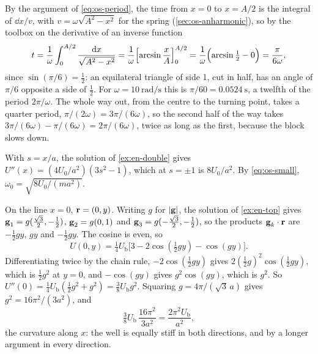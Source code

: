 By the argument of \cref{eq:os-period}, the time
from $x = 0$ to $x = A/2$ is the integral of $\dd x/v$, with $v =
\omega\sqrt{A^2 - x^2}$ for the spring (\cref{sec:os-anharmonic}), so by
the toolbox on the derivative of an inverse function
\begin{equation*}
   t = \frac{1}{\omega}\int_0^{A/2}\frac{\mathrm{d} x}{\sqrt{A^2 - x^2}}
   = \frac1\omega\Bigl[\arcsin\frac{x}{A}\Bigr]_0^{A/2}
   = \frac{1}{\omega}\Bigl(\arcsin\tfrac12 - 0\Bigr) = \frac{\pi}{6\omega} ,
\end{equation*}
since $\sin(\pi/6) = \frac12$: an equilateral triangle of side 1, cut in
half, has an angle of $\pi/6$ opposite a side of $\frac12$. For $\omega =
\SI{10}{\radian\per\second}$ this is $\pi/60 = \SI{0.0524}{\second}$, a
twelfth of the period $2\pi/\omega$. The whole way out, from the centre to
the turning point, takes a quarter period, $\pi/(2\omega) =
3\pi/(6\omega)$, so the second half of the way takes $3\pi/(6\omega) -
\pi/(6\omega) = 2\pi/(6\omega)$, twice as long as the first, because the
block slows down.

With $s = x/a$, the solution of
\cref{ex:en-double} gives $U''(x) = (4U_0/a^2)(3s^2 - 1)$, which at $s =
\pm1$ is $8U_0/a^2$. By \cref{eq:os-small}, $\omega_0 = \sqrt{8U_0/(m
a^2)}$.

On the line $x = 0$, $\bm{\mathrm{r}} = (0, y)$.
Writing $g$ for $\lvert\bm{\mathrm{g}}\rvert$, the solution of \cref{ex:en-top}
gives $\bm{\mathrm{g}}_1 = g(\frac{\sqrt3}{2}, -\frac12)$, $\bm{\mathrm{g}}_2 = g(0, 1)$ and
$\bm{\mathrm{g}}_3 = g(-\frac{\sqrt3}{2}, -\frac12)$, so the products
$\bm{\mathrm{g}}_k\cdot\bm{\mathrm{r}}$ are $-\frac12 gy$, $gy$ and $-\frac12 gy$. The
cosine is even, so
\begin{equation*}
      U(0, y) = \tfrac14 U_{\mathrm b}\bigl[3 - 2\cos(\tfrac12 gy)
   - \cos(gy)\bigr] .
\end{equation*}
Differentiating twice by the chain rule, $-2\cos(\frac12 gy)$ gives
$2(\frac12 g)^2\cos(\frac12 gy)$, which is $\frac12 g^2$ at $y = 0$, and
$-\cos(gy)$ gives $g^2\cos(gy)$, which is $g^2$. So $U''(0) =
\frac14U_{\mathrm b}(\frac12g^2 + g^2) = \frac38U_{\mathrm b}g^2$.
Squaring $g = 4\pi/(\sqrt3\,a)$ gives $g^2 = 16\pi^2/(3a^2)$, and
\begin{equation*}
   \tfrac38U_{\mathrm b}\,\frac{16\pi^2}{3a^2} = \frac{2\pi^2U_{\mathrm b}}{a^2} ,
\end{equation*}
the curvature along $x$: the well is equally stiff in both directions, and
by a longer argument in every direction.

